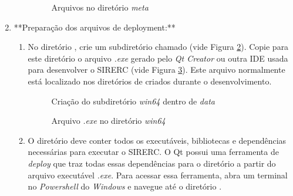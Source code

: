 \documentclass[a4paper,11pt]{article}
\newcommand{\sistema}{\textsf{SIRERC}}
\newcommand{\qtcreator}{\textit{Qt Creator}}
\newcommand{\windows}{\textit{Windows}}
\begin{document}
\begin{enumerate}
\begin{enumerate}
		\begin{figure}[H]\centering
			\caption{Arquivos no diretório \emph{meta}}\label{fig:sirercpackagemeta}
		\end{figure}
	\end{enumerate}
	
	\item **Preparação dos arquivos de deployment:**
	\begin{enumerate}
		\item No diretório , crie um subdiretório chamado  (vide Figura \ref{fig:sirercdatawin64}). Copie para este diretório o arquivo \emph{.exe} gerado pelo \qtcreator{} ou outra IDE usada para desenvolver o \sistema{} (vide Figura \ref{fig:sirercdataexe}). Este arquivo normalmente está localizado nos diretórios de  criados durante o desenvolvimento.
		
		\begin{figure}[H]\centering
			\caption{Criação do subdiretório \emph{win64} dentro de \emph{data}}\label{fig:sirercdatawin64}
		\end{figure}
		
		\begin{figure}[H]\centering
			\caption{Arquivo \emph{.exe} no diretório \emph{win64}}\label{fig:sirercdataexe}
		\end{figure}
		
		\item O diretório  deve conter todos os executáveis, bibliotecas e dependências necessárias para executar o \sistema{}. O Qt possui uma ferramenta de \emph{deploy} que traz todas essas dependências para o diretório a partir do arquivo executável \emph{.exe}. Para acessar essa ferramenta, abra um terminal no \emph{Powershell} do \emph{\windows{}} e navegue até o diretório .
		

\end{enumerate}
\end{enumerate}
\end{document}

